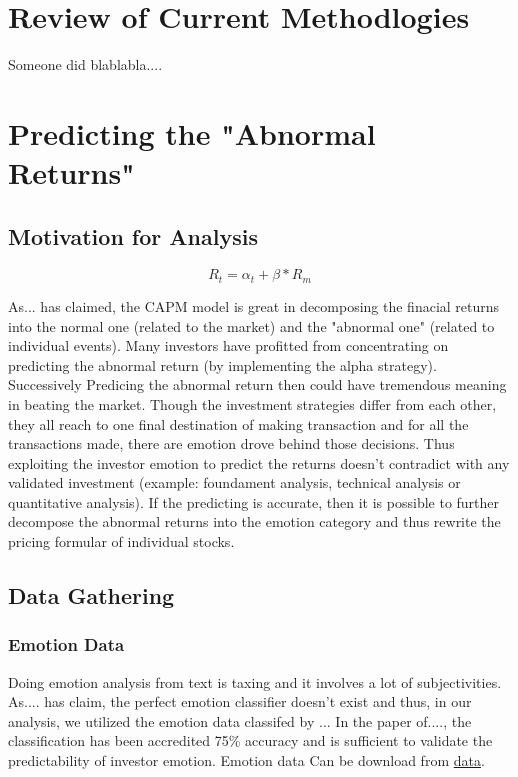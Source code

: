 \documentclass[preprint,12pt]{elsarticle}
\begin{document}


\section{Review of Current Methodlogies}
Someone did blablabla....

\section{Predicting the "Abnormal Returns"}
\subsection{Motivation for Analysis}
$$R_t=\alpha_t+\beta*R_m$$

	As... has claimed, the CAPM model is great in decomposing the finacial returns into the normal one (related to the market) and the "abnormal one" (related to individual events). Many investors have profitted from concentrating on predicting the abnormal return (by implementing the alpha strategy). Successively Predicing the abnormal return then could have tremendous meaning in beating the market.
    Though the investment strategies differ from each other, they all reach to one final destination of making transaction and for all the transactions made, there are emotion drove behind those decisions. Thus exploiting the investor emotion to predict the returns doesn't contradict with any validated investment (example: foundament analysis, technical analysis or quantitative analysis). 
    If the predicting is accurate, then it is possible to further decompose the abnormal returns into the emotion category and thus rewrite the pricing formular of individual stocks.
\subsection{Data Gathering} 
\subsubsection{Emotion Data}
	Doing emotion analysis from text is taxing and it involves a lot of subjectivities. As.... has claim, the perfect emotion classifier doesn't exist and thus, in our analysis, we utilized the emotion data classifed by ... In the paper of...., the classification has been accredited 75\% accuracy and is sufficient to validate the predictability of investor emotion.
   	Emotion data Can be download from
    \href{http://kt.ijs.si/data/Twitter_sentiment_DJIA30}{data}.\\
\end{document}
